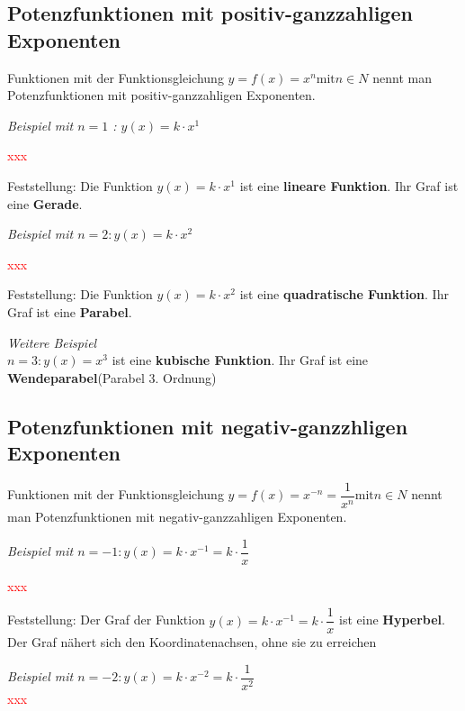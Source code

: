 \documentclass[11pt, a4paper, twoside, fleqn]{article}
\begin{document}
\subsection{Potenzfunktionen mit positiv-ganzzahligen Exponenten}
\begin{flushleft}
Funktionen mit der Funktionsgleichung \(y = f(x) = x^n \text{mit} n \in N\) nennt man  Potenzfunktionen mit positiv-ganzzahligen Exponenten.
\end{flushleft}
\begin{flushleft}
\emph{Beispiel mit \(n=1\) : \(y(x) = k \cdot x^1\)} 
\end{flushleft}
\noindent \textcolor{red}{xxx}
\begin{flushleft}
Feststellung: Die Funktion \(y(x)= k\cdot x^1\) ist eine \textbf{lineare Funktion}. Ihr Graf ist eine \textbf{Gerade}. 
\end{flushleft}
\begin{flushleft}
\emph{Beispiel mit \(n = 2 : y(x) = k \cdot x^2\)}
\end{flushleft}
\noindent \textcolor{red}{xxx}    
\begin{flushleft}
Feststellung: Die Funktion \( y(x) = k \cdot x^2\) ist eine \textbf{quadratische Funktion}. Ihr Graf ist eine \textbf{Parabel}.
\end{flushleft}
\begin{flushleft}
\emph{Weitere Beispiel}\\
\(n = 3: y(x) = x^3\) ist eine \textbf{kubische Funktion}. Ihr Graf ist eine \textbf{Wendeparabel}(Parabel 3. Ordnung)
\end{flushleft}
\newpage
\subsection{Potenzfunktionen mit negativ-ganzzhligen Exponenten}
\begin{flushleft}
Funktionen mit der Funktionsgleichung \(y = f(x) = x^{-n} = \dfrac{1}{x^n} \text{mit} n \in N\) nennt man Potenzfunktionen mit negativ-ganzzahligen Exponenten.
\end{flushleft}
\begin{flushleft}
\emph{Beispiel mit \(n = -1: y(x) = k \cdot x^{-1} = k \cdot \dfrac{1}{x}\)} 
\noindent
\end{flushleft}
\noindent \textcolor{red}{xxx}
\begin{flushleft}
Feststellung: Der Graf der Funktion \( y(x) = k \cdot x^{-1} = k \cdot \dfrac{1}{x}\) ist eine \textbf{Hyperbel}. Der Graf nähert sich den Koordinatenachsen, ohne sie zu erreichen
\end{flushleft}
\begin{flushleft}
\emph{Beispiel mit \( n = -2: y(x) = k\cdot x^{-2} = k \cdot \dfrac{1}{x^2}\)} \\
\textcolor{red}{xxx}
\end{flushleft}
\newpage
\end{document}
